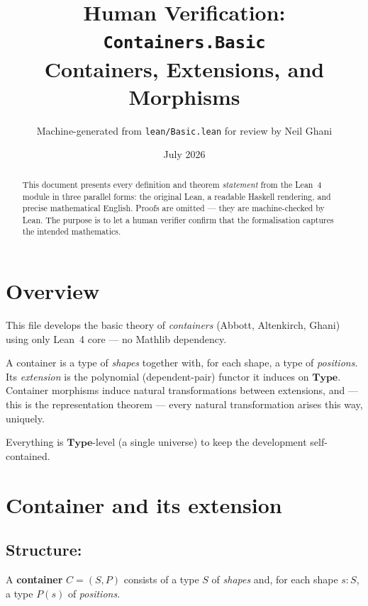 \documentclass[11pt,a4paper]{article}
\title{Human Verification: \texttt{Containers.Basic}\\[4pt]
  \large Containers, Extensions, and Morphisms}
\author{Machine-generated from \texttt{lean/Basic.lean} for review by Neil Ghani}
\date{July 2026}
\begin{document}
\maketitle

\begin{abstract}
This document presents every definition and theorem \emph{statement} from the
Lean~4 module  in three parallel forms: the original
Lean, a readable Haskell rendering, and precise mathematical English.  Proofs
are omitted --- they are machine-checked by Lean.  The purpose is to let a
human verifier confirm that the formalisation captures the intended
mathematics.
\end{abstract}

\tableofcontents
\bigskip

\section{Overview}

This file develops the basic theory of \emph{containers} (Abbott, Altenkirch,
Ghani) using only Lean~4 core --- no Mathlib dependency.

A container is a type of \emph{shapes} together with, for each shape, a type
of \emph{positions}.  Its \emph{extension} is the polynomial (dependent-pair)
functor it induces on $\mathbf{Type}$.  Container morphisms induce natural
transformations between extensions, and --- this is the representation theorem
--- every natural transformation arises this way, uniquely.

Everything is $\mathbf{Type}$-level (a single universe) to keep the
development self-contained.

\section{Container and its extension}

\subsection{Structure: }

\begin{defn}[Container]
A \textbf{container} $C = (S, P)$ consists of a type $S$ of \emph{shapes}
and, for each shape $s : S$, a type $P(s)$ of \emph{positions}.
\end{defn}
\end{document}
